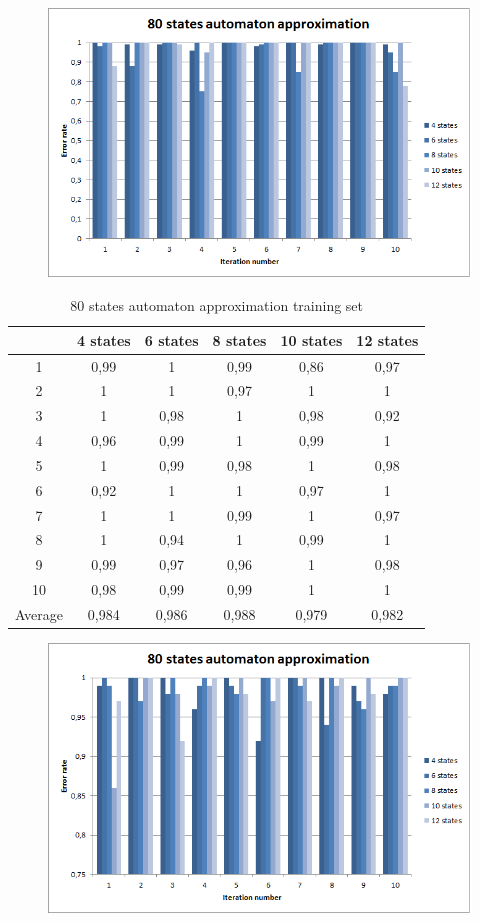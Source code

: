 \documentclass[runningheads,a4paper]{llncs}
\begin{document}
\begin{figure}
\centering
\includegraphics[scale=1]{5.png}
\end{figure}


\begin{table}[]
\centering
\caption{80 states automaton approximation training set}
\label{my-label}
\begin{tabular}{@{}cccccc@{}}
\toprule
        & 4 states & 6 states & 8 states & 10 states & 12 states    \\ \midrule
1       & 0,99     & 1        & 0,99     & 0,86      & 0,97 \\
2       & 1        & 1        & 0,97     & 1         & 1 \\
3       & 1        & 0,98     & 1        & 0,98      & 0,92 \\
4       & 0,96     & 0,99     & 1        & 0,99      & 1   \\
5       & 1        & 0,99     & 0,98     & 1         & 0,98   \\
6       & 0,92     & 1        & 1        & 0,97      & 1    \\
7       & 1        & 1        & 0,99     & 1         & 0,97    \\
8       & 1        & 0,94     & 1        & 0,99      & 1    \\
9       & 0,99     & 0,97     & 0,96     & 1         & 0,98 \\
10      & 0,98     & 0,99     & 0,99     & 1         & 1  \\
Average & 0,984    & 0,986    & 0,988    & 0,979     & 0,982  \\ \bottomrule
\end{tabular}
\end{table}


\begin{figure}
\centering
\includegraphics[scale=1]{10.png}
\end{figure} 
\end{document}
